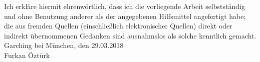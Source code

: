 \cleardoublepage
%

Ich erkläre hiermit ehrenwörtlich, dass ich die vorliegende Arbeit selbstständig und ohne Benutzung anderer als der angegebenen Hilfsmittel angefertigt habe; die aus fremden Quellen (einschließlich elektronischer Quellen) direkt oder indirekt übernommenen Gedanken sind ausnahmslos als solche kenntlich gemacht.
\vspace{1cm}\\
Garching bei München, den 29.03.2018
\vspace{2.5cm}\\
Furkan Öztürk